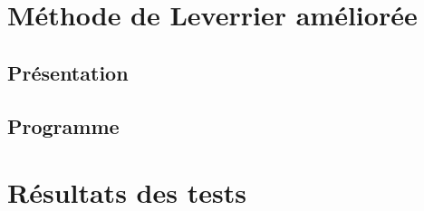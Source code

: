 \documentclass{report}
\begin{document}
    \section{Méthode de Leverrier améliorée}
      \subsection{Présentation}
      \subsection{Programme}
	
	\newpage
    \section{Résultats des tests}
      \renewcommand{\arraystretch}{1.8}
\end{document}
